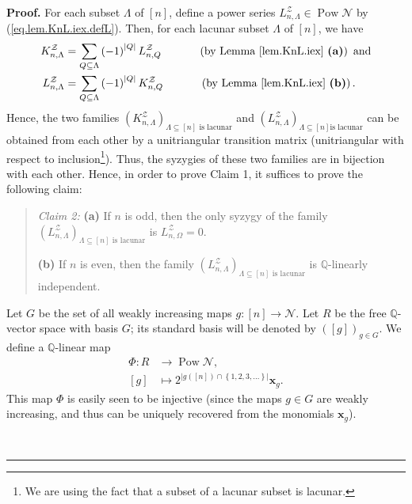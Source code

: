 \documentclass[numbers=enddot,12pt,final,onecolumn,notitlepage]{scrartcl}%
\theoremstyle{definition}
\newenvironment{statement}{\begin{quote}}{\end{quote}}
\newenvironment{proof}[1][Proof]{\noindent\textbf{#1.} }{\ \rule{0.5em}{0.5em}}
\let\sumnonlimits\sum
\renewcommand{\sum}{\sumnonlimits\limits}
\begin{document}
\begin{proof}
For each subset $\Lambda$ of $\left[  n\right]  $, define a power series
$L_{n,\Lambda}^{\mathcal{Z}}\in\operatorname*{Pow}\mathcal{N}$ by
(\ref{eq.lem.KnL.iex.defL}). Then, for each lacunar subset $\Lambda$ of
$\left[  n\right]  $, we have%
\begin{align*}
K_{n,\Lambda}^{\mathcal{Z}}  &  =\sum_{Q\subseteq\Lambda}\left(  -1\right)
^{\left\vert Q\right\vert }L_{n,Q}^{\mathcal{Z}}\ \ \ \ \ \ \ \ \ \ \left(
\text{by Lemma \ref{lem.KnL.iex} \textbf{(a)}}\right)  \text{ and}\\
L_{n,\Lambda}^{\mathcal{Z}}  &  =\sum_{Q\subseteq\Lambda}\left(  -1\right)
^{\left\vert Q\right\vert }K_{n,Q}^{\mathcal{Z}}\ \ \ \ \ \ \ \ \ \ \left(
\text{by Lemma \ref{lem.KnL.iex} \textbf{(b)}}\right)  .
\end{align*}
Hence, the two families $\left(  K_{n,\Lambda}^{\mathcal{Z}}\right)
_{\Lambda\subseteq\left[  n\right]  \text{ is lacunar}}$ and $\left(
L_{n,\Lambda}^{\mathcal{Z}}\right)  _{\Lambda\subseteq\left[  n\right]  \text{
is lacunar}}$ can be obtained from each other by a unitriangular transition
matrix (unitriangular with respect to inclusion\footnote{We are using the fact
that a subset of a lacunar subset is lacunar.}). Thus, the syzygies of these
two families are in bijection with each other. Hence, in order to prove Claim
1, it suffices to prove the following claim:

\begin{statement}
\textit{Claim 2:} \textbf{(a)} If $n$ is odd, then the only syzygy of the
family $\left(  L_{n,\Lambda}^{\mathcal{Z}}\right)  _{\Lambda\subseteq\left[
n\right]  \text{ is lacunar}}$ is $L_{n,\Omega}^{\mathcal{Z}}=0$.

\textbf{(b)} If $n$ is even, then the family $\left(  L_{n,\Lambda
}^{\mathcal{Z}}\right)  _{\Lambda\subseteq\left[  n\right]  \text{ is
lacunar}}$ is $\mathbb{Q}$-linearly independent.
\end{statement}

Let $G$ be the set of all weakly increasing maps $g:\left[  n\right]
\rightarrow\mathcal{N}$. Let $R$ be the free $\mathbb{Q}$-vector space with
basis $G$; its standard basis will be denoted by $\left(  \left[  g\right]
\right)  _{g\in G}$. We define a $\mathbb{Q}$-linear map%
\begin{align*}
\Phi:R  &  \rightarrow\operatorname*{Pow}\mathcal{N},\\
\left[  g\right]   &  \mapsto2^{\left\vert g\left(  \left[  n\right]  \right)
\cap\left\{  1,2,3,\ldots\right\}  \right\vert }\mathbf{x}_{g}.
\end{align*}
This map $\Phi$ is easily seen to be injective (since the maps $g\in G$ are
weakly increasing, and thus can be uniquely recovered from the monomials
$\mathbf{x}_{g}$).


\end{proof}
\end{document}
